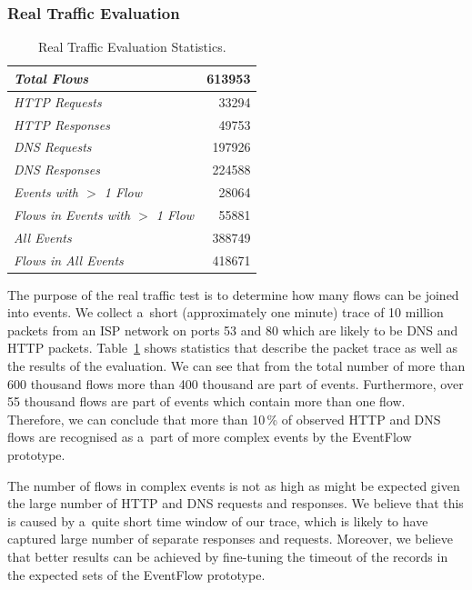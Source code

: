 \subsubsection{Real Traffic Evaluation}

\begin{table}[!tb]
	\caption{Real Traffic Evaluation Statistics.}
	\centering
	\renewcommand{\arraystretch}{1.1}
	\begin{tabular}{|l|r|} \hline
		\textit{Total Flows} & 613953 \\ \hline
		\textit{HTTP Requests} & 33294  \\  \hline
		\textit{HTTP Responses} & 49753  \\  \hline
		\textit{DNS Requests} & 197926  \\  \hline
		\textit{DNS Responses} & 224588  \\  \hline
		\textit{Events with $>$ 1 Flow} & 28064  \\  \hline
		\textit{Flows in Events with $>$ 1 Flow} & 55881  \\  \hline
		\textit{All Events} & 388749 \\  \hline
		\textit{Flows in All Events} & 418671 \\  \hline
	\end{tabular}
	\label{tab:eventflow-stats}
\end{table}

The purpose of the real traffic test is to determine how many flows can be joined into events. We collect a~short (approximately one minute) trace of 10 million packets from an ISP network on ports 53 and 80 which are likely to be DNS and HTTP packets. Table~\ref{tab:eventflow-stats} shows statistics that describe the packet trace as well as the results of the evaluation. We can see that from the total number of more than 600 thousand flows more than 400 thousand are part of events. Furthermore, over 55 thousand flows are part of events which contain more than one flow. Therefore, we can conclude that more than 10\,\% of observed HTTP and DNS flows are recognised as a~part of more complex events by the EventFlow prototype.

The number of flows in complex events is not as high as might be expected given the large number of HTTP and DNS requests and responses. We believe that this is caused by a~quite short time window of our trace, which is likely to have captured large number of separate responses and requests. Moreover, we believe that better results can be achieved by fine-tuning the timeout of the records in the expected sets of the EventFlow prototype.


